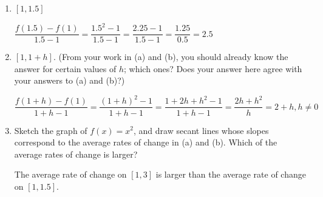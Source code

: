 \documentclass{article}
\begin{document}
\begin{enumerate}
\begin{enumerate}
    \begin{solution}
      $\dfrac{f(3)-f(1)}{3-1}=\dfrac{3^2-1}{3-1}=\dfrac{9-1}{3-1}=\dfrac{8}{2}=\boxed{4}$
    \end{solution}

  \item
    \begin{problem}[\vfill]
      $[1, 1.5]$
    \end{problem}

    \begin{solution}
      $\dfrac{f(1.5)-f(1)}{1.5-1}=\dfrac{1.5^2-1}{1.5-1} = \dfrac{2.25-1}{1.5-1}= 
      \dfrac{1.25}{0.5}=\boxed{2.5}$
    \end{solution}

  \item


    \begin{problem}[\stretch{2}]
      $[1, 1 + h]$.  (From your work in (a) and (b), you should already
      know the answer for certain values of $h$; which ones?  Does your
      answer here agree with your answers to (a) and (b)?)
    \end{problem}

    \begin{solution}
      $\dfrac{f(1+h)-f(1)}{1+h-1}=\dfrac{(1+h)^2-1}{1+h-1}=\dfrac{1+2h+h^2-1}{1+h-1}
      = \dfrac{2h+h^2}{h} =\boxed{2+h, h \neq 0}$
    \end{solution}

  \item
    \begin{problem}[\stretch{2}]
      Sketch the graph of $f(x) = x^2$, and draw secant lines whose slopes
      correspond to the average rates of change in (a) and (b).  Which of
      the average rates of change is larger?
    \end{problem}

    \begin{solution}
      The average rate of change on $[1, 3]$ is larger than the average rate of change
      on $[1, 1.5]$.
      
    \end{solution}


\end{enumerate}
\end{enumerate}
\end{document}

